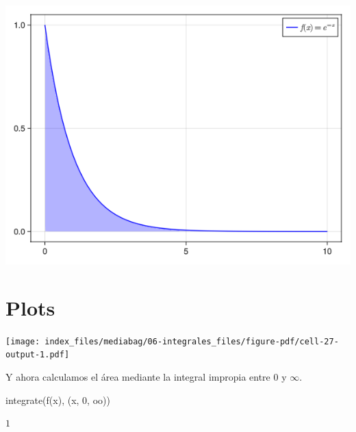 \documentclass[
  a4paper,
]{scrreport}
\newenvironment{Shaded}{\begin{snugshade}}{\end{snugshade}}
\newcommand{\BuiltInTok}[1]{\textcolor[rgb]{0.00,0.23,0.31}{#1}}
\newcommand{\DataTypeTok}[1]{\textcolor[rgb]{0.68,0.00,0.00}{#1}}
\newcommand{\FloatTok}[1]{\textcolor[rgb]{0.68,0.00,0.00}{#1}}
\newcommand{\FunctionTok}[1]{\textcolor[rgb]{0.28,0.35,0.67}{#1}}
\newcommand{\ImportTok}[1]{\textcolor[rgb]{0.00,0.46,0.62}{#1}}
\newcommand{\NormalTok}[1]{\textcolor[rgb]{0.00,0.23,0.31}{#1}}
\newcommand{\OperatorTok}[1]{\textcolor[rgb]{0.37,0.37,0.37}{#1}}
\newcommand{\PreprocessorTok}[1]{\textcolor[rgb]{0.68,0.00,0.00}{#1}}
\newcommand{\SpecialCharTok}[1]{\textcolor[rgb]{0.37,0.37,0.37}{#1}}
\newcommand{\StringTok}[1]{\textcolor[rgb]{0.13,0.47,0.30}{#1}}
\theoremstyle{definition}
\theoremstyle{remark}
\begin{document}
\begin{tcolorbox}
\includegraphics{06-integrales_files/figure-pdf/cell-26-output-1.png}

\section{Plots}

\begin{Shaded}
\end{Shaded}

\texttt{[image: index\_files/mediabag/06-integrales\_files/figure-pdf/cell-27-output-1.pdf]}

Y ahora calculamos el área mediante la integral impropia entre \(0\) y
\(\infty\).

\begin{Shaded}
\begin{Highlighting}[]
\FunctionTok{integrate}\NormalTok{(}\FunctionTok{f}\NormalTok{(x), (x, }\FloatTok{0}\NormalTok{, oo))}
\end{Highlighting}
\end{Shaded}

$1$

\end{tcolorbox}
\end{document}

